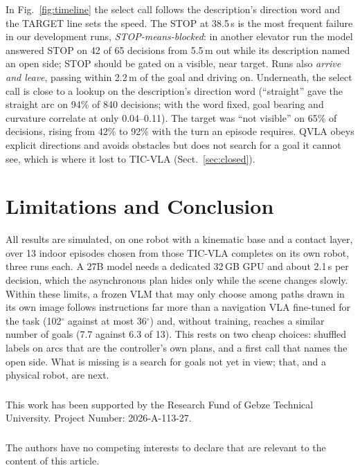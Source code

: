 \documentclass[runningheads]{llncs}
\begin{document}
In Fig.~\ref{fig:timeline} the select call follows the description's direction word and
the TARGET line sets the speed. The STOP at 38.5\,s is the most frequent failure in our
development runs, \emph{STOP-means-blocked}: in another elevator run the model answered STOP on 42 of 65 decisions
from 5.5\,m out while its description named an open side; STOP should be gated on a visible,
near target. Runs also \emph{arrive and leave}, passing within 2.2\,m of the goal and driving
on. Underneath, the select call is close to a lookup
on the description's direction word (``straight'' gave the straight arc on 94\% of 840
decisions; with the word fixed, goal bearing and curvature correlate at only 0.04--0.11). The target was ``not visible'' on 65\% of decisions, rising
from 42\% to 92\% with the turn an episode requires. QVLA obeys explicit directions and avoids
obstacles but does not search for a goal it cannot see, which is where it lost to TIC-VLA
(Sect.~\ref{sec:closed}).

\section{Limitations and Conclusion}
\label{sec:conclusion}

All results are simulated, on one robot with a kinematic base and a contact layer, over 13
indoor episodes chosen from those TIC-VLA completes on its own robot, three runs each. A 27B
model needs a dedicated 32\,GB GPU and about 2.1\,s per decision, which the asynchronous plan
hides only while the scene changes slowly. Within these limits, a frozen VLM that may only
choose among paths drawn in its own image follows instructions far more than a navigation VLA
fine-tuned for the task (102$^\circ$ against at most 36$^\circ$) and, without training,
reaches a similar number of goals (7.7 against 6.3 of 13). This rests on two cheap choices:
shuffled labels on arcs that are the controller's own plans, and a first call that names the
open side. What is missing is a search for goals not yet in view; that, and a physical robot,
are next.

\begin{credits}
\subsubsection{\ackname}
This work has been supported by the Research Fund of Gebze Technical University. Project
Number: 2026-A-113-27.

\subsubsection{\discintname}
The authors have no competing interests to declare that are relevant to the content of this
article.
\end{credits}
%


%
\end{document}
